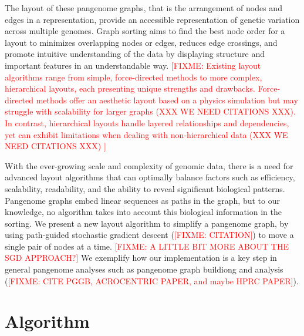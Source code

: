 \documentclass{bioinfo}
\theoremstyle{definition}
\newcommand{\red}[1]{{\textcolor{Red}{#1}}}
\newcommand{\FIXME}[1]{\red{[FIXME: #1]}}
\begin{document}
The layout of these pangenome graphs, that is the arrangement of nodes and edges in a representation, provide an accessible representation of genetic variation across multiple genomes.
Graph sorting aims to find the best node order for a layout to minimizes overlapping nodes or edges, reduces edge crossings, and promote intuitive understanding of the data by displaying structure and important features in an understandable way.
\FIXME{
	Existing layout algorithms range from simple, force-directed methods to more complex, hierarchical layouts, each presenting unique strengths and drawbacks.
	Force-directed methods offer an aesthetic layout based on a physics simulation but may struggle with scalability for larger graphs (XXX WE NEED CITATIONS XXX).
	In contrast, hierarchical layouts handle layered relationships and dependencies, yet can exhibit limitations when dealing with non-hierarchical data (XXX WE NEED CITATIONS XXX)
}

With the ever-growing scale and complexity of genomic data, there is a need for advanced layout algorithms that can optimally balance factors such as
efficiency, scalability, readability, and the ability to reveal significant biological patterns.
Pangenome graphs embed linear sequences as paths in the graph, but to our knowledge, no algorithm takes into account this biological information in the sorting.
We present a new layout algorithm to simplify a pangenome graph, by using path-guided stochastic gradient descent (\FIXME{CITATION}) to move a single pair of nodes at a time.
\FIXME{A LITTLE BIT MORE ABOUT THE SGD APPROACH?}
We exemplify how our implementation is a key step in general pangenome analyses such as pangenome graph buildiong and analysis (\FIXME{CITE PGGB, ACROCENTRIC PAPER, and maybe HPRC PAPER}).

\section{Algorithm}
\end{document}
